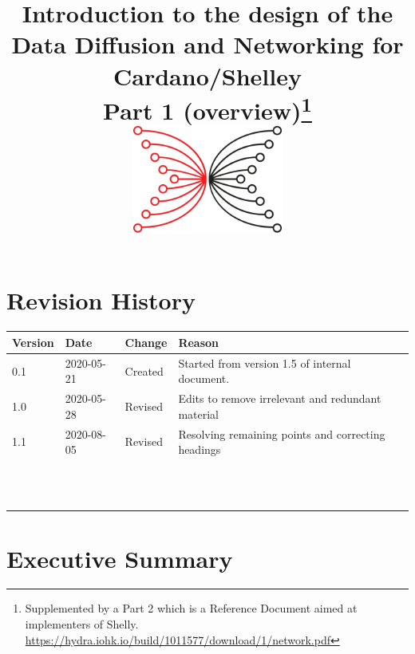 \documentclass[11pt,a4paper]{article}
\begin{document}
\title{Introduction to the design of the
       Data Diffusion and Networking for
       Cardano/Shelley \\
       Part 1 (overview)\footnote{Supplemented by a Part 2 which is a
       Reference Document aimed at implementers of Shelly.
  \href{https://hydra.iohk.io/build/1011577/download/1/network.pdf}{{https://hydra.iohk.io/build/1011577/download/1/network.pdf}}} \\ \vspace{1cm}
       \includegraphics[width=1.95833in,height=1.40669in]{./media/image3.png}
  }
\date{}

\maketitle

\tableofcontents

\section{Revision History}
\label{revision-history}

\begin{longtable}[]{@{}llll@{}}
\toprule
\textbf{Version} & \textbf{Date} & \textbf{Change} &
\textbf{Reason}\tabularnewline
\midrule
\endhead
0.1 & 2020-05-21 & Created & Started from version 1.5 of internal
document.\tabularnewline
1.0 & 2020-05-28 & Revised & Edits to remove irrelevant and redundant
material\tabularnewline
1.1 & 2020-08-05 & Revised & Resolving remaining points and correcting
headings\tabularnewline
& & &\tabularnewline
& & &\tabularnewline
& & &\tabularnewline
& & &\tabularnewline
& & &\tabularnewline
& & &\tabularnewline
& & &\tabularnewline
& & &\tabularnewline
& & &\tabularnewline
& & &\tabularnewline
& & &\tabularnewline
& & &\tabularnewline
\bottomrule
\end{longtable}

\section{Executive Summary}
\label{executive-summary}
\end{document}
